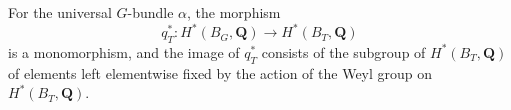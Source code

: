For the universal $G$-bundle $\alpha$, the morphism
\[
q^*_T \colon H^*(B_G, \mathbf{Q}) \to H^*(B_T, \mathbf{Q})
\]
is a monomorphism, and the image of $q^*_T$ consists of the subgroup of $H^*(B_T, \mathbf{Q})$ of elements left elementwise fixed by the action of the Weyl group on $H^*(B_T, \mathbf{Q})$.
